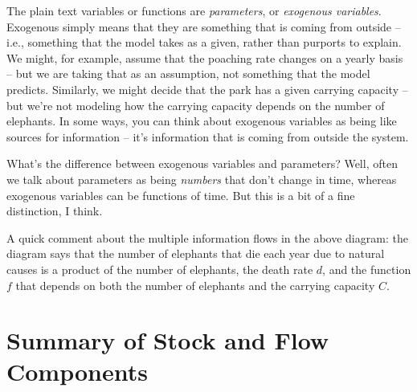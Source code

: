 The plain text variables or functions are {\it parameters}, or {\it exogenous variables}.  Exogenous simply means that they are something that is coming from outside -- i.e., something that the model takes as a given, rather than purports to explain.  We might, for example, assume that the poaching rate changes on a yearly basis -- but we are taking that as an assumption, not something that the model predicts.  Similarly, we might decide that the park has a given carrying capacity  -- but we're not modeling how the carrying capacity depends on the number of elephants.  In some ways, you can think about exogenous variables as being like sources for information -- it's information that is coming from outside the system.

What's the difference between exogenous variables and parameters?  Well, often we talk about parameters as being {\it numbers} that don't change in time, whereas exogenous variables can be functions of time.  But this is a bit of a fine distinction, I think.

A quick comment about the multiple information flows in the above diagram:  the diagram says that the number of elephants that die each year due to natural causes is a product of the number of elephants, the death rate $d$, and the function $f$ that depends on both the number of elephants and the carrying capacity $C$.

\vfill

\pagebreak

\section{Summary of Stock and Flow Components}

